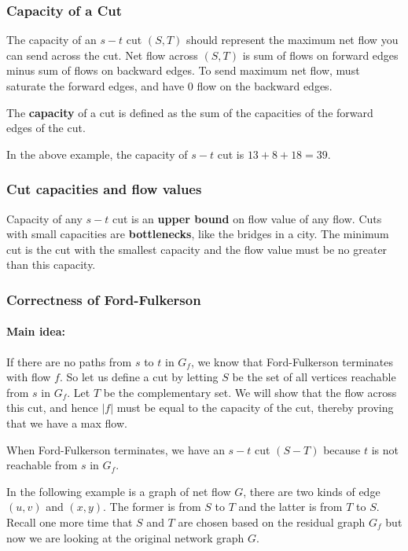 \subsubsection{Capacity of a Cut}
The capacity of an $s-t$ cut $(S, T)$ should represent the maximum net flow you can send across the cut. Net flow across $(S, T)$ is sum of flows on forward edges minus sum of flows on backward edges. To send maximum net flow, must saturate the forward edges, and have 0 flow on the backward edges.
\begin{definition}
	The \textbf{capacity} of a cut is defined as the sum of the capacities of the forward edges of the cut.
\end{definition}

In the above example, the capacity of $s-t$ cut is $13 + 8 + 18 = 39$.

\subsubsection{Cut capacities and flow values}
Capacity of any $s-t$ cut is an \textbf{upper bound} on flow value of any flow. Cuts with small capacities are \textbf{bottlenecks}, like the bridges in a city. The minimum cut is the cut with the smallest capacity and the flow value must be no greater than this capacity.

\subsubsection{Correctness of Ford-Fulkerson}
\paragraph{Main idea:} If there are no paths from $s$ to $t$ in $G_f$, we know that Ford-Fulkerson terminates with flow $f$. So let us define a cut by letting $S$ be the set of all vertices reachable from $s$ in $G_f$. Let $T$ be the complementary set. We will show that the flow across this cut, and hence $|f|$ must be equal to the capacity of the cut, thereby proving that we have a max flow.

When Ford-Fulkerson terminates, we have an $s-t$ cut $(S-T)$ because $t$ is not
reachable from $s$ in $G_f$.

In the following example is a graph of net flow $G$, there are two kinds of edge $(u,v)$ and $(x,y)$. The former is from $S$ to $T$ and the latter is from $T$ to $S$. Recall one more time that $S$ and $T$ are chosen based on the residual graph $G_f$ but now we are looking at the original network graph $G$.

